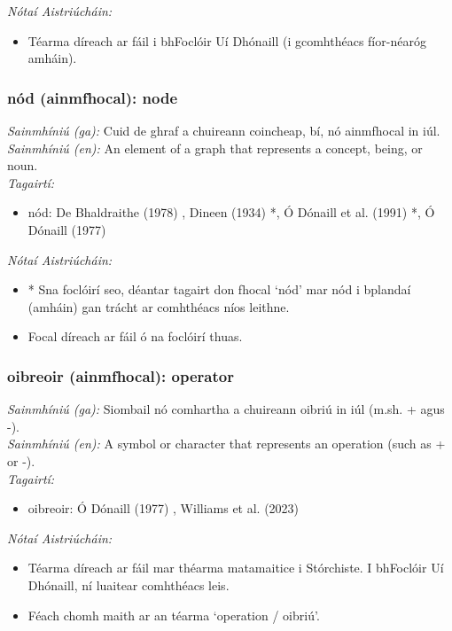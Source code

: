 \noindent \textit{Nótaí Aistriúcháin:}
\begin{itemize}
	\item Téarma díreach ar fáil i bhFoclóir Uí Dhónaill (i gcomhthéacs fíor-néaróg amháin).
\end{itemize}


\subsubsection*{nód (ainmfhocal): node}
 \noindent \textit{Sainmhíniú (ga):} Cuid de ghraf a chuireann coincheap, bí, nó ainmfhocal in iúl.
\\
 \noindent \textit{Sainmhíniú (en):} An element of a graph that represents a concept, being, or noun.
\\
 \noindent \textit{Tagairtí:}
\begin{itemize}
	\item nód: De Bhaldraithe (1978) \cite{de-bhaldraithe}, Dineen (1934) \cite{dineen}*, Ó Dónaill et al. (1991) \cite{focloir-beag}*, Ó Dónaill (1977) \cite{odonaill}
\end{itemize}

 \noindent \textit{Nótaí Aistriúcháin:}
\begin{itemize}
	\item * Sna foclóirí seo, déantar tagairt don fhocal `nód' mar nód i bplandaí (amháin) gan trácht ar comhthéacs níos leithne.
	\item Focal díreach ar fáil ó na foclóirí thuas.
\end{itemize}


\subsubsection*{oibreoir (ainmfhocal): operator}
 \noindent \textit{Sainmhíniú (ga):} Siombail nó comhartha a chuireann oibriú in iúl (m.sh. + agus -).
\\
 \noindent \textit{Sainmhíniú (en):} A symbol or character that represents an operation (such as + or -).
\\
 \noindent \textit{Tagairtí:}
\begin{itemize}
	\item oibreoir: Ó Dónaill (1977) \cite{odonaill}, Williams et al. (2023) \cite{storchiste}
\end{itemize}

 \noindent \textit{Nótaí Aistriúcháin:}
\begin{itemize}
	\item Téarma díreach ar fáil mar théarma matamaitice i Stórchiste. I bhFoclóir Uí Dhónaill, ní luaitear comhthéacs leis.
	\item Féach chomh maith ar an téarma `operation / oibriú'.
\end{itemize}


